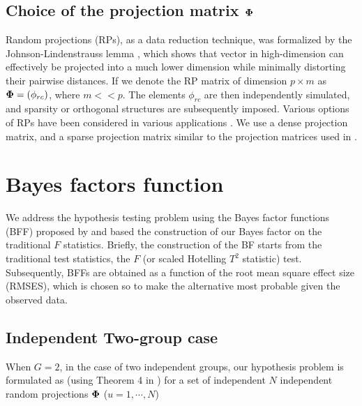 \documentclass[pdflatex,sn-basic]{sn-jnl}%
\newcommand{\uzero}            {\mbox{\boldmath$0$}}
\def\MVN{\hbox{MVN}}
\def\be{\begin{eqnarray}}
\def\ee{\end{eqnarray}}
\newcommand{\udelta}            {\mbox{\boldmath$\delta$}}
\newcommand{\uSigma}            {\mbox{\boldmath$\Sigma$}}
\newcommand{\uPhi}              {\mbox{\boldmath$\Phi$}}
\theoremstyle{thmstyleone}%
\theoremstyle{thmstyletwo}%
\theoremstyle{thmstylethree}%
\begin{document}
\subsection{Choice of the projection matrix $\uPhi$}
Random projections (RPs), as a data reduction technique, was formalized by the Johnson-Lindenstrauss lemma \citep{johnson84extensionslipschitz}, which shows that vector in high-dimension can effectively be projected into a much lower dimension while minimally distorting their pairwise distances. If we denote the RP matrix of dimension $p \times m$ as $\uPhi = (\phi_{rc})$, where $m << p$. The elements $\phi_{rc}$ are then independently simulated, and sparsity or orthogonal structures are subsequently imposed. Various options of RPs have been considered in various applications \citep{achlioptas2001database,li2006very,lopes2011more}. We use a dense projection matrix, and a sparse projection matrix similar to the projection matrices used in \citep{srivastava2014raptt,zoh2018powerful}.      

\section{Bayes factors function}
We address the hypothesis testing problem using the Bayes factor functions (BFF) proposed by \cite{johnson2023bayes} and based the construction of our Bayes factor on the traditional $F$ statistics. Briefly, the construction of the BF starts from the traditional test statistics, the $F$ (or scaled Hotelling $T^2$ statistic) test. Subsequently, BFFs are obtained as a function of the root mean square effect size (RMSES), which is chosen so to make the alternative most probable given the observed data.  
\subsection{Independent Two-group case}
When $G = 2$, in the case of two independent groups, our hypothesis problem is formulated as (using Theorem 4 in \cite{johnson2023bayes}) for a set of independent $N$ independent random projections $\uPhi$ ($ u = 1, \cdots, N$)

\end{document}
